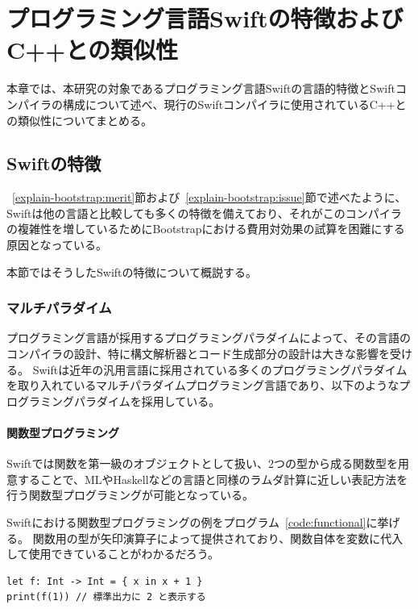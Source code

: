 \chapter{プログラミング言語Swiftの特徴およびC++との類似性}
\label{explain-swift}

本章では、本研究の対象であるプログラミング言語Swiftの言語的特徴とSwiftコンパイラの構成について述べ、現行のSwiftコンパイラに使用されているC++との類似性についてまとめる。

\section{Swiftの特徴}
\label{explain-swift:features}

~\ref{explain-bootstrap:merit}節および~\ref{explain-bootstrap:issue}節で述べたように、Swiftは他の言語と比較しても多くの特徴を備えており、それがこのコンパイラの複雑性を増しているためにBootstrapにおける費用対効果の試算を困難にする原因となっている。

本節ではそうしたSwiftの特徴について概説する。

\subsection{マルチパラダイム}

プログラミング言語が採用するプログラミングパラダイムによって、その言語のコンパイラの設計、特に構文解析器とコード生成部分の設計は大きな影響を受ける。
Swiftは近年の汎用言語に採用されている多くのプログラミングパラダイムを取り入れているマルチパラダイムプログラミング言語であり、以下のようなプログラミングパラダイムを採用している。

\subsubsection{関数型プログラミング}

Swiftでは関数を第一級のオブジェクトとして扱い、2つの型から成る関数型を用意することで、MLやHaskellなどの言語と同様のラムダ計算に近しい表記方法を行う関数型プログラミングが可能となっている。

Swiftにおける関数型プログラミングの例をプログラム~\ref{code:functional}に挙げる。
関数用の型が矢印演算子によって提供されており、関数自体を変数に代入して使用できていることがわかるだろう。

\begin{lstlisting}[caption=Swiftにおける関数型プログラミングの例, label=code:functional]
let f: Int -> Int = { x in x + 1 }
print(f(1)) // 標準出力に 2 と表示する
\end{lstlisting}


